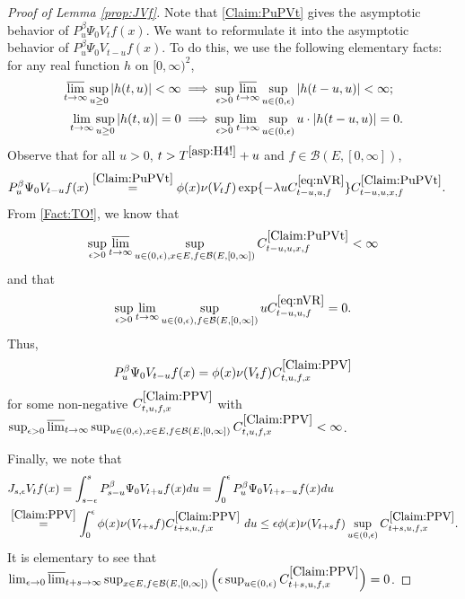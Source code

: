 \documentclass[12pt,a4paper]{amsart}
\numberwithin{equation}{section}
\theoremstyle{plain}
\theoremstyle{definition}
\theoremstyle{remark}
\begin{document}
\begin{proof}[Proof of Lemma \ref{prop:JVf}]
	Note that \eqref{Claim:PuPVt} gives the asymptotic behavior of $P_u^\beta \Psi_0 V_t f(x)$.
	We want to reformulate it into the asymptotic behavior  of $P_u^\beta \Psi_0 V_{t-u} f(x)$.	
	To do this, we use the following elementary facts: for any real function $h$ on $[0,\infty)^2$,
	\begin{align}\label{Fact:TO!}
	\varlimsup_{t\to \infty} \sup_{u\geq 0} |h(t,u)| < \infty & \implies \sup_{\epsilon > 0} \varlimsup_{t\to \infty} \sup_{u \in (0,\epsilon)} |h(t-u,u)| < \infty;
	\\ 	\lim_{t\to \infty} \sup_{u \geq 0} |h(t,u)| = 0 & \implies \sup_{\epsilon > 0} \lim_{t\to \infty} \sup_{u \in (0,\epsilon)} u\cdot |h(t-u,u)| = 0.
	\end{align}
	Observe that for all $u>0$, $t> T^{\eqref{asp:H4!}} + u$ and $f \in \mathcal B(E,[0,\infty])$,
	\begin{align}
	& P_u^\beta \Psi_0 V_{t-u} f(x)
	\overset{\eqref{Claim:PuPVt}}= \phi(x) \nu(V_{t}f) \exp\{-\lambda u C^{\eqref{eq:nVR}}_{t-u,u,f} \} C^{\eqref{Claim:PuPVt}}_{t-u,u,x,f}.
	\end{align}
	From \eqref{Fact:TO!}, we know that
	\[
	\sup_{\epsilon > 0}\varlimsup_{t\to \infty} 
	\sup_{u\in (0,\epsilon), x\in E, f \in \mathcal B(E,[0,\infty])} 
	C^{\eqref{Claim:PuPVt}}_{t-u,u,x,f} < \infty
	\]
	and that
	\[
	\sup_{\epsilon > 0}\lim_{t\to \infty} 
	\sup_{u\in (0,\epsilon), f \in \mathcal B(E,[0,\infty])} 
	uC^{\eqref{eq:nVR}}_{t-u,u,f} =0.
	\]
	Thus,
\begin{equation}
	\label{Claim:PPV}
	P_u^\beta \Psi_0 V_{t-u} f(x) = \phi(x)\nu(V_tf) C^{\eqref{Claim:PPV}}_{t,u,f,x}
\end{equation}
	for some non-negative $C^{\eqref{Claim:PPV}}_{t, u,f,x}$ with 
	$\sup_{\epsilon > 0} \varlimsup_{t\to \infty} 
	\sup_{u \in (0,\epsilon), x\in E, f \in \mathcal B(E,[0,\infty])} 
	C^{\eqref{Claim:PPV}}_{t,u,f,x} < \infty$.

	Finally, we note that
	\begin{align}
	&J_{s,\epsilon}V_tf(x) = \int_{s-\epsilon}^s P_{s-u}^\beta \Psi_0 V_{t+u} f(x)du
	= \int_0^\epsilon P_u^\beta \Psi_0 V_{t+s - u}f(x) du
	\\& \overset{\eqref{Claim:PPV}}= \int_0^\epsilon \phi(x) \nu(V_{t+s}f) C^{\eqref{Claim:PPV}}_{t+s,u,f,x}~du
	\leq \epsilon \phi(x)\nu(V_{t+s}f) \sup_{u\in (0,\epsilon)} C^{\eqref{Claim:PPV}}_{t+s,u,f,x}.
	\end{align}
	It is elementary to see that $\lim_{\epsilon \to 0}\varlimsup_{t+s \to \infty}
	\sup_{x\in E, f \in \mathcal B(E,[0,\infty])}
	\Big(\epsilon \sup_{u\in (0,\epsilon)} C^{\eqref{Claim:PPV}}_{t+s,u,f,x}\Big) = 0$.
\end{proof}
\end{document}
